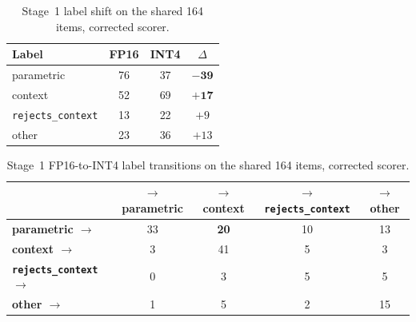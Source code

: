 \documentclass{article} %
\begin{document}
\begin{table}[h]
\caption{Stage~1 label shift on the shared 164 items, corrected scorer.}
\label{tab:labels}
\centering\small
\begin{tabular}{lccc}
\toprule
Label & FP16 & INT4 & $\Delta$ \\
\midrule
parametric & 76 & 37 & $\mathbf{-39}$ \\
context & 52 & 69 & $\mathbf{+17}$ \\
\texttt{rejects\_context} & 13 & 22 & $+9$ \\
other & 23 & 36 & $+13$ \\
\bottomrule
\end{tabular}
\end{table}

\begin{table}[h]
\caption{Stage~1 FP16-to-INT4 label transitions on the shared 164 items, corrected scorer.}
\label{tab:transitions}
\centering\small
\begin{tabular}{lcccc}
\toprule
 & $\to$ parametric & $\to$ context & $\to$ \texttt{rejects\_context} & $\to$ other \\
\midrule
\textbf{parametric $\to$} & 33 & \textbf{20} & 10 & 13 \\
\textbf{context $\to$} & 3 & 41 & 5 & 3 \\
\textbf{\texttt{rejects\_context} $\to$} & 0 & 3 & 5 & 5 \\
\textbf{other $\to$} & 1 & 5 & 2 & 15 \\
\bottomrule
\end{tabular}
\end{table}
\end{document}
